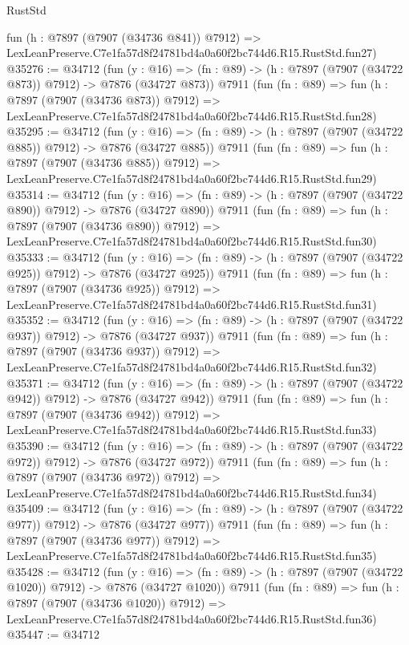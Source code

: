 \begin{lexlean}{RustStd}
\begin{coremodule}
    fun (h : @7897 (@7907 (@34736 @841)) @7912) =>
    LexLeanPreserve.C7e1fa57d8f24781bd4a0a60f2bc744d6.R15.RustStd.fun27)
@35276 := @34712
    (fun (y : @16) => (fn : @89) -> (h : @7897 (@7907 (@34722 @873)) @7912) -> @7876 (@34727 @873))
    @7911
    (fun (fn : @89) =>
    fun (h : @7897 (@7907 (@34736 @873)) @7912) =>
    LexLeanPreserve.C7e1fa57d8f24781bd4a0a60f2bc744d6.R15.RustStd.fun28)
@35295 := @34712
    (fun (y : @16) => (fn : @89) -> (h : @7897 (@7907 (@34722 @885)) @7912) -> @7876 (@34727 @885))
    @7911
    (fun (fn : @89) =>
    fun (h : @7897 (@7907 (@34736 @885)) @7912) =>
    LexLeanPreserve.C7e1fa57d8f24781bd4a0a60f2bc744d6.R15.RustStd.fun29)
@35314 := @34712
    (fun (y : @16) => (fn : @89) -> (h : @7897 (@7907 (@34722 @890)) @7912) -> @7876 (@34727 @890))
    @7911
    (fun (fn : @89) =>
    fun (h : @7897 (@7907 (@34736 @890)) @7912) =>
    LexLeanPreserve.C7e1fa57d8f24781bd4a0a60f2bc744d6.R15.RustStd.fun30)
@35333 := @34712
    (fun (y : @16) => (fn : @89) -> (h : @7897 (@7907 (@34722 @925)) @7912) -> @7876 (@34727 @925))
    @7911
    (fun (fn : @89) =>
    fun (h : @7897 (@7907 (@34736 @925)) @7912) =>
    LexLeanPreserve.C7e1fa57d8f24781bd4a0a60f2bc744d6.R15.RustStd.fun31)
@35352 := @34712
    (fun (y : @16) => (fn : @89) -> (h : @7897 (@7907 (@34722 @937)) @7912) -> @7876 (@34727 @937))
    @7911
    (fun (fn : @89) =>
    fun (h : @7897 (@7907 (@34736 @937)) @7912) =>
    LexLeanPreserve.C7e1fa57d8f24781bd4a0a60f2bc744d6.R15.RustStd.fun32)
@35371 := @34712
    (fun (y : @16) => (fn : @89) -> (h : @7897 (@7907 (@34722 @942)) @7912) -> @7876 (@34727 @942))
    @7911
    (fun (fn : @89) =>
    fun (h : @7897 (@7907 (@34736 @942)) @7912) =>
    LexLeanPreserve.C7e1fa57d8f24781bd4a0a60f2bc744d6.R15.RustStd.fun33)
@35390 := @34712
    (fun (y : @16) => (fn : @89) -> (h : @7897 (@7907 (@34722 @972)) @7912) -> @7876 (@34727 @972))
    @7911
    (fun (fn : @89) =>
    fun (h : @7897 (@7907 (@34736 @972)) @7912) =>
    LexLeanPreserve.C7e1fa57d8f24781bd4a0a60f2bc744d6.R15.RustStd.fun34)
@35409 := @34712
    (fun (y : @16) => (fn : @89) -> (h : @7897 (@7907 (@34722 @977)) @7912) -> @7876 (@34727 @977))
    @7911
    (fun (fn : @89) =>
    fun (h : @7897 (@7907 (@34736 @977)) @7912) =>
    LexLeanPreserve.C7e1fa57d8f24781bd4a0a60f2bc744d6.R15.RustStd.fun35)
@35428 := @34712
    (fun (y : @16) =>
    (fn : @89) -> (h : @7897 (@7907 (@34722 @1020)) @7912) -> @7876 (@34727 @1020))
    @7911
    (fun (fn : @89) =>
    fun (h : @7897 (@7907 (@34736 @1020)) @7912) =>
    LexLeanPreserve.C7e1fa57d8f24781bd4a0a60f2bc744d6.R15.RustStd.fun36)
@35447 := @34712

\end{coremodule}
\end{lexlean}
